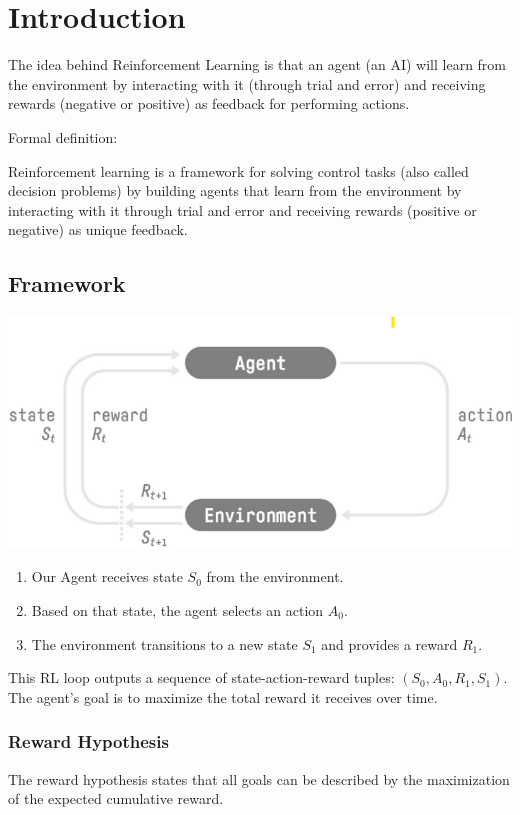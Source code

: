 \section{Introduction}

The idea behind Reinforcement Learning is that an agent (an AI) will learn from the environment by interacting with it (through trial and error) and receiving rewards (negative or positive) as feedback for performing actions.

Formal definition:
\begin{definition}
    Reinforcement learning is a framework for solving control tasks (also called decision problems) by building agents that learn from the environment by interacting with it through trial and error and receiving rewards (positive or negative) as unique feedback.
\end{definition}

\subsection{Framework}

\includegraphics{images/RL_framwork.png}
\begin{enumerate}
    \item Our Agent receives state $S_0$ from the environment.
    \item Based on that state, the agent selects an action $A_0$.
    \item The environment transitions to a new state $S_1$ and provides a reward $R_1$.
\end{enumerate}
This RL loop outputs a sequence of state-action-reward tuples: $(S_0, A_0, R_1, S_1)$. The agent's goal is to maximize the total reward it receives over time.

\subsubsection{Reward Hypothesis}
\begin{definition}
    The reward hypothesis states that all goals can be described by the maximization of the expected cumulative reward.
\end{definition}

